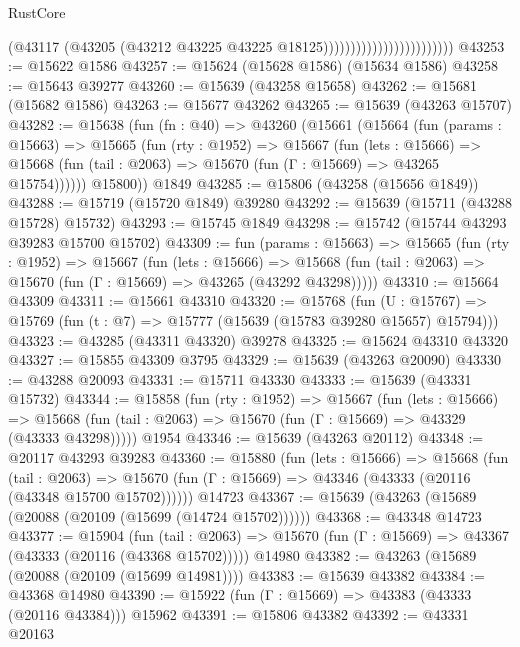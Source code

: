 \begin{lexlean}{RustCore}
\begin{coremodule}
                                              (@43117
                                                (@43205
                                                  (@43212
                                                    @43225
                                                    @43225
                                                    @18125))))))))))))))))))))))))
@43253 := @15622 @1586
@43257 := @15624 (@15628 @1586) (@15634 @1586)
@43258 := @15643 @39277
@43260 := @15639 (@43258 @15658)
@43262 := @15681 (@15682 @1586)
@43263 := @15677 @43262
@43265 := @15639 (@43263 @15707)
@43282 := @15638
    (fun (fn : @40) =>
    @43260
      (@15661
        (@15664
          (fun (params : @15663) =>
          @15665
            (fun (rty : @1952) =>
            @15667
              (fun (lets : @15666) =>
              @15668 (fun (tail : @2063) => @15670 (fun (Γ : @15669) => @43265 @15754))))))
        @15800))
    @1849
@43285 := @15806 (@43258 (@15656 @1849))
@43288 := @15719 (@15720 @1849) @39280
@43292 := @15639 (@15711 (@43288 @15728) @15732)
@43293 := @15745 @1849
@43298 := @15742 (@15744 @43293 @39283 @15700 @15702)
@43309 := fun (params : @15663) =>
  @15665
    (fun (rty : @1952) =>
    @15667
      (fun (lets : @15666) =>
      @15668 (fun (tail : @2063) => @15670 (fun (Γ : @15669) => @43265 (@43292 @43298)))))
@43310 := @15664 @43309
@43311 := @15661 @43310
@43320 := @15768
    (fun (U : @15767) => @15769 (fun (t : @7) => @15777 (@15639 (@15783 @39280 @15657) @15794)))
@43323 := @43285 (@43311 @43320) @39278
@43325 := @15624 @43310 @43320
@43327 := @15855 @43309 @3795
@43329 := @15639 (@43263 @20090)
@43330 := @43288 @20093
@43331 := @15711 @43330
@43333 := @15639 (@43331 @15732)
@43344 := @15858
    (fun (rty : @1952) =>
    @15667
      (fun (lets : @15666) =>
      @15668 (fun (tail : @2063) => @15670 (fun (Γ : @15669) => @43329 (@43333 @43298)))))
    @1954
@43346 := @15639 (@43263 @20112)
@43348 := @20117 @43293 @39283
@43360 := @15880
    (fun (lets : @15666) =>
    @15668
      (fun (tail : @2063) =>
      @15670 (fun (Γ : @15669) => @43346 (@43333 (@20116 (@43348 @15700 @15702))))))
    @14723
@43367 := @15639 (@43263 (@15689 (@20088 (@20109 (@15699 (@14724 @15702))))))
@43368 := @43348 @14723
@43377 := @15904
    (fun (tail : @2063) => @15670 (fun (Γ : @15669) => @43367 (@43333 (@20116 (@43368 @15702)))))
    @14980
@43382 := @43263 (@15689 (@20088 (@20109 (@15699 @14981))))
@43383 := @15639 @43382
@43384 := @43368 @14980
@43390 := @15922 (fun (Γ : @15669) => @43383 (@43333 (@20116 @43384))) @15962
@43391 := @15806 @43382
@43392 := @43331 @20163

\end{coremodule}
\end{lexlean}
